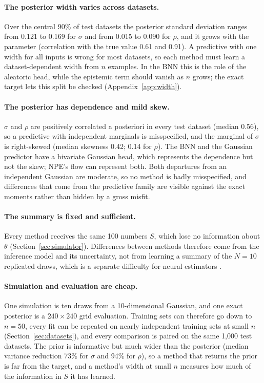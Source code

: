 \documentclass[11pt]{article}
\begin{document}
\paragraph{The posterior width varies across datasets.}
Over the central 90\% of test datasets the posterior standard deviation ranges from 0.121 to 0.169 for $\sigma$ and
from 0.015 to 0.090 for $\rho$, and it grows with the parameter (correlation with the true value 0.61 and 0.91).
A predictive with one width for all inputs is wrong for most datasets, so each method must learn a
dataset-dependent width from $n$ examples. In the BNN this is the role of the aleatoric head, while the epistemic term should vanish
as $n$ grows; the exact target lets this split be checked (Appendix~\ref{app:width}).

\paragraph{The posterior has dependence and mild skew.}
$\sigma$ and $\rho$ are positively correlated a posteriori in every test dataset (median 0.56), so a predictive
with independent marginals is misspecified, and the marginal of $\sigma$ is right-skewed (median skewness 0.42;
0.14 for $\rho$). The BNN and the Gaussian predictor have a bivariate Gaussian head, which represents the dependence
but not the skew; NPE's flow can represent both. Both departures from an independent Gaussian are moderate, so no
method is badly misspecified, and differences that come from the predictive family are visible against the exact
moments rather than hidden by a gross misfit.

\paragraph{The summary is fixed and sufficient.}
Every method receives the same 100 numbers $S$, which lose no information about $\theta$
(Section~\ref{sec:simulator}). Differences between methods therefore come from the inference model and its
uncertainty, not from learning a summary of the $N=10$ replicated draws, which is a separate difficulty for neural
estimators \citep{sainsburydale2024neural}.

\paragraph{Simulation and evaluation are cheap.}
One simulation is ten draws from a 10-dimensional Gaussian, and one exact posterior is a $240\times240$ grid
evaluation. Training sets can therefore go down to $n=50$, every fit can be repeated on nearly independent training sets
at small $n$ (Section~\ref{sec:datasets}), and every comparison is paired on the same 1{,}000 test datasets. The prior is
informative but much wider than the posterior (median variance reduction 73\% for $\sigma$ and 94\% for $\rho$), so a
method that returns the prior is far from the target, and a method's width at small $n$ measures how much of the
information in $S$ it has learned.
\end{document}
